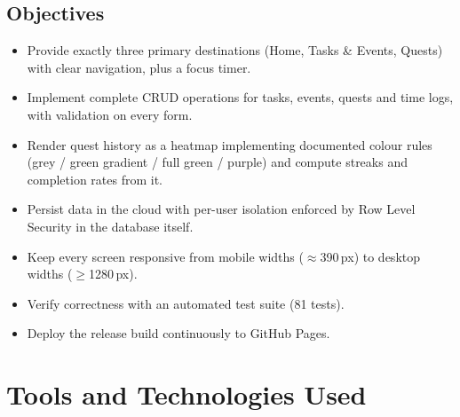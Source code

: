 \documentclass[12pt,a4paper]{article}
\begin{document}
\subsection{Objectives}
\begin{itemize}
  \item Provide exactly three primary destinations (Home, Tasks \& Events,
        Quests) with clear navigation, plus a focus timer.
  \item Implement complete CRUD operations for tasks, events, quests and
        time logs, with validation on every form.
  \item Render quest history as a heatmap implementing documented colour
        rules (grey / green gradient / full green / purple) and compute
        streaks and completion rates from it.
  \item Persist data in the cloud with per-user isolation enforced by
        Row Level Security in the database itself.
  \item Keep every screen responsive from mobile widths ($\approx$390\,px)
        to desktop widths ($\geq$1280\,px).
  \item Verify correctness with an automated test suite (81 tests).
  \item Deploy the release build continuously to GitHub Pages.
\end{itemize}

\section{Tools and Technologies Used}
\end{document}
